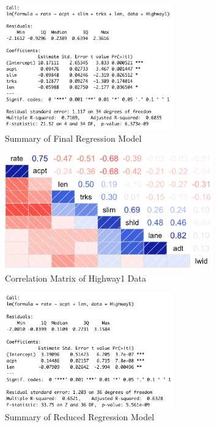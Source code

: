 \documentclass[12pt]{report}
\begin{document}
\begin{figure}[H]
    \centering
    \includegraphics[width=0.65\textwidth]{Variable Selection/Summary Final Model.png}
    \caption{Summary of Final Regression Model} \label{fig:HT2}
\end{figure}
\noindent

\begin{figure}[H]
    \centering
    \includegraphics[width=0.8\textwidth]{Diagnostics/ST562 Corr Matrix.png}
    \caption{Correlation Matrix of Highway1 Data} \label{fig:DC1}
\end{figure}
\noindent

\begin{figure}[H]
    \centering
    \includegraphics[width=0.65\textwidth]{Hypothesis tests/Reduced model.png}
    \caption{Summary of Reduced Regression Model} \label{fig:HT3}
\end{figure}
\noindent
\end{document}
